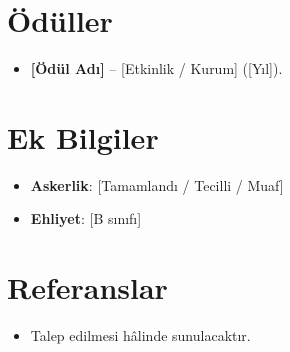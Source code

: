 \documentclass[11pt,a4paper,sans]{moderncv}
\begin{document}
\section{Ödüller}
\vspace{1pt}
\begin{itemize}
\item{\textbf{[Ödül Adı]} -- [Etkinlik / Kurum] ([Yıl]).}
\end{itemize}


\section{Ek Bilgiler}
\vspace{1pt}
\begin{itemize}
\item \textbf{Askerlik}: [Tamamlandı / Tecilli / Muaf]
\item \textbf{Ehliyet}: [B sınıfı]
\end{itemize}


\section{Referanslar}
\vspace{1pt}
\begin{itemize}
\item{Talep edilmesi hâlinde sunulacaktır.}
\end{itemize}
\end{document}
